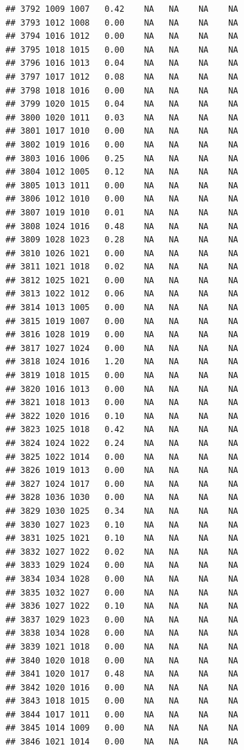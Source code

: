 \documentclass{article}\usepackage{graphicx, color}
\makeatletter
\newenvironment{kframe}{%
 \def\at@end@of@kframe{}%
 \ifinner\ifhmode%
  \def\at@end@of@kframe{\end{minipage}}%
  \begin{minipage}{\columnwidth}%
 \fi\fi%
 \def\FrameCommand##1{\hskip\@totalleftmargin \hskip-\fboxsep
 \colorbox{shadecolor}{##1}\hskip-\fboxsep
     \hskip-\linewidth \hskip-\@totalleftmargin \hskip\columnwidth}%
 \MakeFramed {\advance\hsize-\width
   \@totalleftmargin\z@ \linewidth\hsize
   \@setminipage}}%
 {\par\unskip\endMakeFramed%
 \at@end@of@kframe}
\newenvironment{knitrout}{}{} %
\makeatother
\begin{document}
\begin{knitrout}
\begin{kframe}
\begin{verbatim}
## 3792 1009 1007   0.42    NA   NA    NA    NA
## 3793 1012 1008   0.00    NA   NA    NA    NA
## 3794 1016 1012   0.00    NA   NA    NA    NA
## 3795 1018 1015   0.00    NA   NA    NA    NA
## 3796 1016 1013   0.04    NA   NA    NA    NA
## 3797 1017 1012   0.08    NA   NA    NA    NA
## 3798 1018 1016   0.00    NA   NA    NA    NA
## 3799 1020 1015   0.04    NA   NA    NA    NA
## 3800 1020 1011   0.03    NA   NA    NA    NA
## 3801 1017 1010   0.00    NA   NA    NA    NA
## 3802 1019 1016   0.00    NA   NA    NA    NA
## 3803 1016 1006   0.25    NA   NA    NA    NA
## 3804 1012 1005   0.12    NA   NA    NA    NA
## 3805 1013 1011   0.00    NA   NA    NA    NA
## 3806 1012 1010   0.00    NA   NA    NA    NA
## 3807 1019 1010   0.01    NA   NA    NA    NA
## 3808 1024 1016   0.48    NA   NA    NA    NA
## 3809 1028 1023   0.28    NA   NA    NA    NA
## 3810 1026 1021   0.00    NA   NA    NA    NA
## 3811 1021 1018   0.02    NA   NA    NA    NA
## 3812 1025 1021   0.00    NA   NA    NA    NA
## 3813 1022 1012   0.06    NA   NA    NA    NA
## 3814 1013 1005   0.00    NA   NA    NA    NA
## 3815 1019 1007   0.00    NA   NA    NA    NA
## 3816 1028 1019   0.00    NA   NA    NA    NA
## 3817 1027 1024   0.00    NA   NA    NA    NA
## 3818 1024 1016   1.20    NA   NA    NA    NA
## 3819 1018 1015   0.00    NA   NA    NA    NA
## 3820 1016 1013   0.00    NA   NA    NA    NA
## 3821 1018 1013   0.00    NA   NA    NA    NA
## 3822 1020 1016   0.10    NA   NA    NA    NA
## 3823 1025 1018   0.42    NA   NA    NA    NA
## 3824 1024 1022   0.24    NA   NA    NA    NA
## 3825 1022 1014   0.00    NA   NA    NA    NA
## 3826 1019 1013   0.00    NA   NA    NA    NA
## 3827 1024 1017   0.00    NA   NA    NA    NA
## 3828 1036 1030   0.00    NA   NA    NA    NA
## 3829 1030 1025   0.34    NA   NA    NA    NA
## 3830 1027 1023   0.10    NA   NA    NA    NA
## 3831 1025 1021   0.10    NA   NA    NA    NA
## 3832 1027 1022   0.02    NA   NA    NA    NA
## 3833 1029 1024   0.00    NA   NA    NA    NA
## 3834 1034 1028   0.00    NA   NA    NA    NA
## 3835 1032 1027   0.00    NA   NA    NA    NA
## 3836 1027 1022   0.10    NA   NA    NA    NA
## 3837 1029 1023   0.00    NA   NA    NA    NA
## 3838 1034 1028   0.00    NA   NA    NA    NA
## 3839 1021 1018   0.00    NA   NA    NA    NA
## 3840 1020 1018   0.00    NA   NA    NA    NA
## 3841 1020 1017   0.48    NA   NA    NA    NA
## 3842 1020 1016   0.00    NA   NA    NA    NA
## 3843 1018 1015   0.00    NA   NA    NA    NA
## 3844 1017 1011   0.00    NA   NA    NA    NA
## 3845 1014 1009   0.00    NA   NA    NA    NA
## 3846 1021 1014   0.00    NA   NA    NA    NA

\end{verbatim}
\end{kframe}
\end{knitrout}
\end{document}
